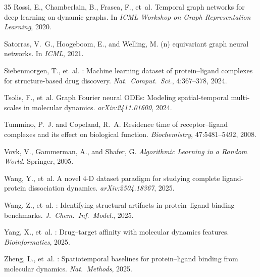 \documentclass{article}
\begin{document}
\begin{thebibliography}{35}
Rossi, E., Chamberlain, B., Frasca, F., et~al.
\newblock Temporal graph networks for deep learning on dynamic graphs.
\newblock In \emph{ICML Workshop on Graph Representation Learning}, 2020.

Satorras, V.~G., Hoogeboom, E., and Welling, M.
(n) equivariant graph neural networks.
\newblock In \emph{ICML}, 2021.

Siebenmorgen, T., et~al.
: Machine learning dataset of protein--ligand complexes for structure-based drug discovery.
\newblock \emph{Nat.\ Comput.\ Sci.}, 4:367--378, 2024.

Tsolis, F., et~al.
\newblock Graph {F}ourier neural {ODE}s: Modeling spatial-temporal multi-scales in molecular dynamics.
\newblock \emph{arXiv:2411.01600}, 2024.

Tummino, P.~J. and Copeland, R.~A.
\newblock Residence time of receptor--ligand complexes and its effect on biological function.
\newblock \emph{Biochemistry}, 47:5481--5492, 2008.

Vovk, V., Gammerman, A., and Shafer, G.
\newblock \emph{Algorithmic Learning in a Random World}.
\newblock Springer, 2005.

Wang, Y., et~al.
\newblock A novel 4-{D} dataset paradigm for studying complete ligand-protein dissociation dynamics.
\newblock \emph{arXiv:2504.18367}, 2025.

Wang, Z., et~al.
: Identifying structural artifacts in protein--ligand binding benchmarks.
\newblock \emph{J.\ Chem.\ Inf.\ Model.}, 2025.

Yang, X., et~al.
: Drug--target affinity with molecular dynamics features.
\newblock \emph{Bioinformatics}, 2025.

Zheng, L., et~al.
: Spatiotemporal baselines for protein--ligand binding from molecular dynamics.
\newblock \emph{Nat.\ Methods}, 2025.

\end{thebibliography}

\clearpage
\appendix
\end{document}
